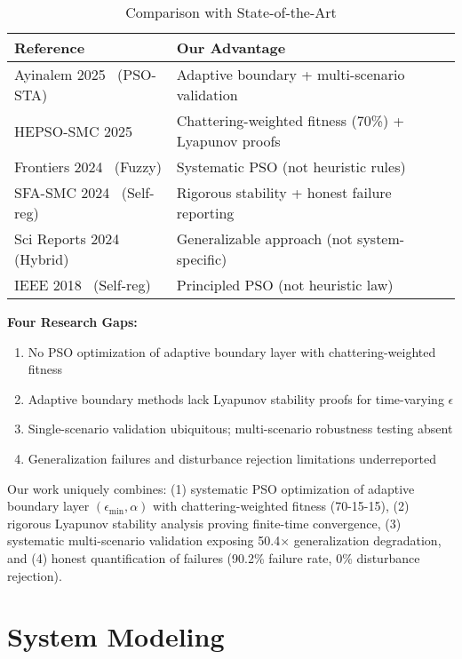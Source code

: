 \documentclass[conference]{IEEEtran}
\begin{document}
\begin{table}[!t]
\caption{Comparison with State-of-the-Art}
\label{tab:comparison}
\centering
\small
\begin{tabular}{@{}p{3.5cm}p{4cm}@{}}
\toprule
\textbf{Reference} & \textbf{Our Advantage} \\
\midrule
Ayinalem 2025~\cite{ayinalem2025pso} (PSO-STA) & Adaptive boundary + multi-scenario validation \\
HEPSO-SMC 2025~\cite{hepso2025manipulator} & Chattering-weighted fitness (70\%) + Lyapunov proofs \\
Frontiers 2024~\cite{frontiers2024fuzzy} (Fuzzy) & Systematic PSO (not heuristic rules) \\
SFA-SMC 2024~\cite{sfa2024rotary} (Self-reg) & Rigorous stability + honest failure reporting \\
Sci Reports 2024~\cite{scirep2024fuzzy} (Hybrid) & Generalizable approach (not system-specific) \\
IEEE 2018~\cite{ieee2018selfreg} (Self-reg) & Principled PSO (not heuristic law) \\
\bottomrule
\end{tabular}
\end{table}

\textbf{Four Research Gaps:}
\begin{enumerate}
\item No PSO optimization of adaptive boundary layer with chattering-weighted fitness
\item Adaptive boundary methods lack Lyapunov stability proofs for time-varying $\epsilon$
\item Single-scenario validation ubiquitous; multi-scenario robustness testing absent
\item Generalization failures and disturbance rejection limitations underreported
\end{enumerate}

Our work uniquely combines: (1) systematic PSO optimization of adaptive boundary layer $(\epsilon_{\min}, \alpha)$ with chattering-weighted fitness (70-15-15), (2) rigorous Lyapunov stability analysis proving finite-time convergence, (3) systematic multi-scenario validation exposing 50.4$\times$ generalization degradation, and (4) honest quantification of failures (90.2\% failure rate, 0\% disturbance rejection).

\section{System Modeling}
\end{document}
